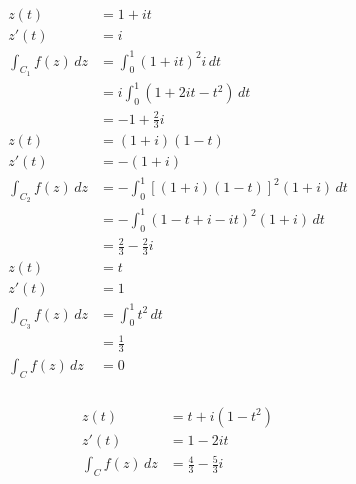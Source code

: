 \documentclass{article}
\begin{document}
\setcounter{subsubsection}{18}
\subsubsection{}

\begin{align*}
  z(t)                  & = 1 + i t                                     \\
  z'(t)                 & = i                                           \\
  \int_{C_1} f(z) \,d z & = \int_0^1 (1 + i t)^2 i \,d t                \\
                        & = i \int_0^1 (1 + 2 i t - t^2) \,d t          \\
                        & = -1 + \frac{2}{3} i                          \\
  z(t)                  & = (1 + i) (1 - t)                             \\
  z'(t)                 & = -(1 + i)                                    \\
  \int_{C_2} f(z) \,d z & = -\int_0^1 [(1 + i) (1 - t)]^2 (1 + i) \,d t \\
                        & = -\int_0^1 (1 - t + i - i t)^2 (1 + i) \,d t \\
                        & = \frac{2}{3} - \frac{2}{3} i                 \\
  z(t)                  & = t                                           \\
  z'(t)                 & = 1                                           \\
  \int_{C_3} f(z) \,d z & = \int_0^1 t^2 \,d t                          \\
                        & = \frac{1}{3}                                 \\
  \int_C f(z) \,d z     & = 0
\end{align*}

\setcounter{subsubsection}{22}
\subsubsection{}

\begin{align*}
  z(t)              & = t + i (1 - t^2)             \\
  z'(t)             & = 1 - 2 i t                   \\
  \int_C f(z) \,d z & = \frac{4}{3} - \frac{5}{3} i
\end{align*}
\end{document}
